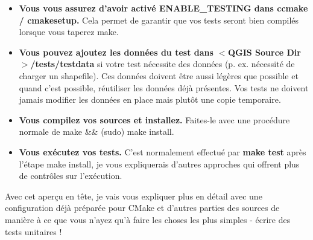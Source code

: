 \begin{itemize}
\item \textbf{Vous vous assurez d'avoir activ\'e ENABLE\_TESTING dans ccmake / cmakesetup.} Cela permet de garantir que vos tests seront bien compil\'es lorsque vous taperez make.

\item \textbf{Vous pouvez ajoutez les donn\'ees du test dans $<$QGIS Source Dir$>$/tests/testdata} si votre test n\'ecessite des donn\'ees (p. ex. n\'ecessit\'e de charger un shapefile). Ces donn\'ees doivent \^etre aussi l\'eg\`eres que possible et quand c'est possible, r\'eutiliser les donn\'ees d\'ej\`a pr\'esentes. Vos tests ne doivent jamais modifier les donn\'ees en place mais plut\^ot une copie temporaire.

\item \textbf{Vous compilez vos sources et installez.} Faites-le avec une proc\'edure normale de make \&\& (sudo) make install.

\item \textbf{Vous ex\'ecutez vos tests.} C'est normalement effectu\'e par \textbf{make test} apr\`es l'\'etape make install, je vous expliquerais d'autres approches qui offrent plus de contr\^oles sur l'ex\'ecution.
\end{itemize}

Avec cet aper\c{c}u en t\^ete, je vais vous expliquer plus en d\'etail avec une configuration d\'ej\`a pr\'epar\'ee pour CMake et d'autres parties des sources de mani\`ere \`a ce que vous n'ayez qu'\`a faire les choses les plus simples - \'ecrire des tests unitaires !

